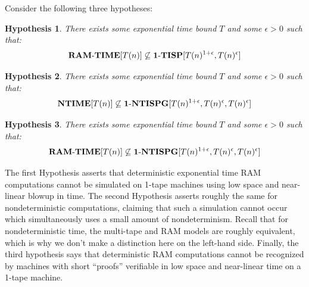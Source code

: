 \documentclass[11pt]{article}
\newtheorem{hypothesis}{Hypothesis}
\newcommand{\dash}{\text{-}}
\def\cl{\bf}
\begin{document}
Consider the following three hypotheses:
\begin{hypothesis}\label{hyp:tisp-lb}
There exists some exponential time bound $T$ and some $\epsilon > 0$ such that:
\[
{\cl RAM\dash TIME}[T(n)] \not\subseteq {\cl 1\dash TISP}[T(n)^{1+\epsilon}, T(n)^{\epsilon}]
\]
\end{hypothesis}
\begin{hypothesis}\label{hyp:ntisp-lb}
There exists some exponential time bound $T$ and some $\epsilon > 0$ such that:
\[
{\cl NTIME}[T(n)] \not\subseteq {\cl 1\dash NTISPG}[T(n)^{1+\epsilon}, T(n)^{\epsilon}, T(n)^{\epsilon}]
\]
\end{hypothesis}

\begin{hypothesis}\label{hyp:strong-ntisp-lb}
There exists some exponential time bound $T$ and some $\epsilon > 0$ such that:
\[
{\cl RAM\dash TIME}[T(n)] \not\subseteq {\cl 1\dash NTISPG}[T(n)^{1+\epsilon}, T(n)^{\epsilon}, T(n)^{\epsilon}]
\]
\end{hypothesis}

The first Hypothesis asserts that deterministic exponential time RAM computations cannot be simulated on 1-tape machines using low space and near-linear blowup in time. The second Hypothesis asserts roughly the same for nondeterministic computations, claiming that such a simulation cannot occur which simultaneously uses a small amount of nondeterminism. Recall that for nondeterministic time, the multi-tape and RAM models are roughly equivalent, which is why we don't make a distinction here on the left-hand side. Finally, the third hypothesis says that deterministic RAM computations cannot be recognized by machines with short ``proofs'' verifiable in low space and near-linear time on a 1-tape machine.
\end{document}

